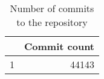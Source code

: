 \begin{table}[ht]
\begin{center}
\begin{tabular}{rr}
  \hline
 & Commit count \\ 
  \hline
1 & 44143 \\ 
   \hline
\end{tabular}
\caption{Number of commits to the repository}
\end{center}
\end{table}
